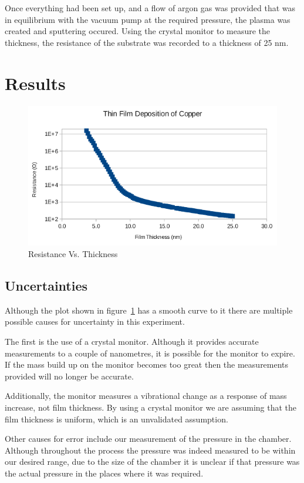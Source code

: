 \documentclass[aps,prl,twocolumn,groupedaddress,showkeys]{revtex4}
\begin{document}
Once everything had been set up, and a flow of argon gas was provided that was in equilibrium with the vacuum pump at the required pressure, the plasma was created and sputtering occured. Using the crystal monitor to measure the thickness, the resistance of the substrate was recorded to a thickness of 25 nm.


\section{Results}

\begin{figure}[h]
	\includegraphics[width=\linewidth]{copperSputtering.png}
	\caption{Resistance Vs. Thickness}
	\label{fig:copperSputtering}
\end{figure}

\subsection{Uncertainties}

Although the plot shown in figure~\ref{fig:copperSputtering} has a smooth curve to it there are multiple possible causes for uncertainty in this experiment.

The first is the use of a crystal monitor. Although it provides accurate measurements to a couple of nanometres, it is possible for the monitor to expire. If the mass build up on the monitor becomes too great then the measurements provided will no longer be accurate.

Additionally, the monitor measures a vibrational change as a response of mass increase, not film thickness. By using a crystal monitor we are assuming that the film thickness is uniform, which is an unvalidated assumption.

Other causes for error include our measurement of the pressure in the chamber. Although throughout the process the pressure was indeed measured to be within our desired range, due to the size of the chamber it is unclear if that pressure was the actual pressure in the places where it was required.
\end{document}

